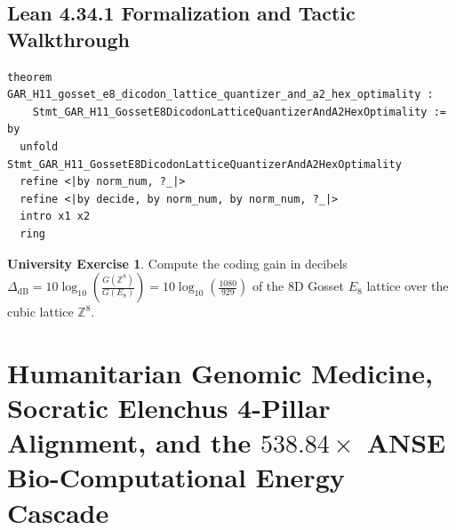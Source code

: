 \documentclass[11pt,a4paper]{article}
\theoremstyle{definition}
\newtheorem{exercise}[theorem]{University Exercise}
\theoremstyle{remark}
\begin{document}
\subsection{Lean 4.34.1 Formalization and Tactic Walkthrough}
\begin{lstlisting}
theorem GAR_H11_gosset_e8_dicodon_lattice_quantizer_and_a2_hex_optimality :
    Stmt_GAR_H11_GossetE8DicodonLatticeQuantizerAndA2HexOptimality := by
  unfold Stmt_GAR_H11_GossetE8DicodonLatticeQuantizerAndA2HexOptimality
  refine <|by norm_num, ?_|>
  refine <|by decide, by norm_num, by norm_num, ?_|>
  intro x1 x2
  ring
\end{lstlisting}

\begin{exercise}
Compute the coding gain in decibels $\Delta_{\mathrm{dB}} = 10\log_{10}\!\left(\frac{G(\mathbb{Z}^8)}{G(E_8)}\right) = 10\log_{10}\!\left(\frac{1080}{929}\right)$ of the 8D Gosset $E_8$ lattice over the cubic lattice $\mathbb{Z}^8$.
\end{exercise}

\section{Humanitarian Genomic Medicine, Socratic Elenchus 4-Pillar Alignment, and the $538.84\times$ ANSE Bio-Computational Energy Cascade}
\end{document}
